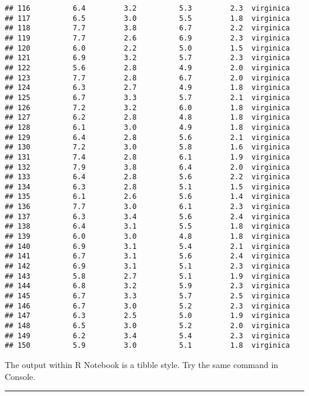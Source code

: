 \documentclass[
]{article}
\begin{document}
\begin{verbatim}
## 116          6.4         3.2          5.3         2.3  virginica
## 117          6.5         3.0          5.5         1.8  virginica
## 118          7.7         3.8          6.7         2.2  virginica
## 119          7.7         2.6          6.9         2.3  virginica
## 120          6.0         2.2          5.0         1.5  virginica
## 121          6.9         3.2          5.7         2.3  virginica
## 122          5.6         2.8          4.9         2.0  virginica
## 123          7.7         2.8          6.7         2.0  virginica
## 124          6.3         2.7          4.9         1.8  virginica
## 125          6.7         3.3          5.7         2.1  virginica
## 126          7.2         3.2          6.0         1.8  virginica
## 127          6.2         2.8          4.8         1.8  virginica
## 128          6.1         3.0          4.9         1.8  virginica
## 129          6.4         2.8          5.6         2.1  virginica
## 130          7.2         3.0          5.8         1.6  virginica
## 131          7.4         2.8          6.1         1.9  virginica
## 132          7.9         3.8          6.4         2.0  virginica
## 133          6.4         2.8          5.6         2.2  virginica
## 134          6.3         2.8          5.1         1.5  virginica
## 135          6.1         2.6          5.6         1.4  virginica
## 136          7.7         3.0          6.1         2.3  virginica
## 137          6.3         3.4          5.6         2.4  virginica
## 138          6.4         3.1          5.5         1.8  virginica
## 139          6.0         3.0          4.8         1.8  virginica
## 140          6.9         3.1          5.4         2.1  virginica
## 141          6.7         3.1          5.6         2.4  virginica
## 142          6.9         3.1          5.1         2.3  virginica
## 143          5.8         2.7          5.1         1.9  virginica
## 144          6.8         3.2          5.9         2.3  virginica
## 145          6.7         3.3          5.7         2.5  virginica
## 146          6.7         3.0          5.2         2.3  virginica
## 147          6.3         2.5          5.0         1.9  virginica
## 148          6.5         3.0          5.2         2.0  virginica
## 149          6.2         3.4          5.4         2.3  virginica
## 150          5.9         3.0          5.1         1.8  virginica
\end{verbatim}

The output within R Notebook is a tibble style. Try the same command in
Console.

\begin{center}\rule{0.5\linewidth}{0.5pt}\end{center}
\end{document}
